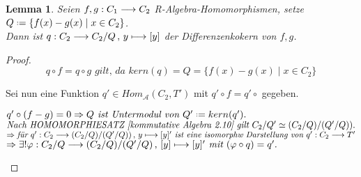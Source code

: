 \documentclass[10pt,a4paper]{report}
\newtheorem{lemma}[satz]{Lemma}
\newcommand{\functionfront}[3]{\nolinebreak{#1:#2 \longrightarrow #3}}
\newcommand{\function}[5]{\nolinebreak{#1:#2 \longrightarrow #3 \, , \, #4 \longmapsto #5}}
\newcommand*{\defeq}{\mathrel{\vcenter{\baselineskip0.5ex \lineskiplimit0pt
                     \hbox{\scriptsize.}\hbox{\scriptsize.}}}%
                     =}
\newcommand{\kernel}[1]{kern(#1)}
\begin{document}
\begin{lemma}
Seien $\functionfront{f,g}{C_1}{C_2}$ R-Algebra-Homomorphismen, setze $Q \defeq \lbrace f(x) - g(x)\mid x \in C_2 \rbrace$.\\
Dann ist $\function{q}{C_2}{C_2/Q}{y}{[y]}$ der Differenzenkokern von $f,g$.
\end{lemma}
\begin{proof}
$$q \circ f = q \circ g \textit{ gilt, da } \kernel{q} = Q = \lbrace f(x) - g(x)\mid x \in C_2 \rbrace$$

Sei nun eine Funktion $q' \in Hom_{\mathcal{A}}(C_2,T')$ mit $q' \circ f = q' \circ$ gegeben.
\begin{spacing}{1.5}
$q' \circ (f - g) = 0 \Rightarrow Q\textit{ ist Untermodul von }Q' \defeq \kernel{q'}.$\\
$\textit{Nach HOMOMORPHIESATZ [kommutative Algebra 2.10] gilt } \nolinebreak{C_2/Q' \simeq (C_2/Q)/(Q'/Q))}.$\\
$\Rightarrow \textit{für } \function{q'}{C_2}{(C_2/Q)/(Q'/Q))}{y}{[y]'} \textit{ ist eine isomorphw Darstellung von } \functionfront{q'}{C_2}{T'}$\\
$\Rightarrow \exists ! \function{\varphi}{C_2/Q}{(C_2/Q)/(Q'/Q)}{[y]}{[y]'}\textit{ mit }(\varphi \circ q) = q'.$
\end{spacing}
\end{proof}
\end{document}
